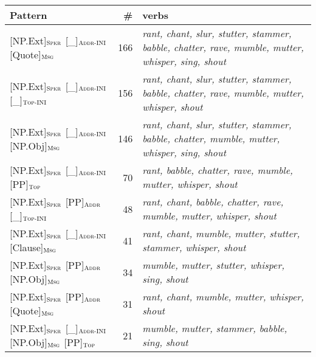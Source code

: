 \documentclass[output=paper,colorlinks,citecolor=brown]{langscibook}
\begin{document}
\begin{table}
\begin{tabularx}{\textwidth}{lrQ}
\lsptoprule
         Pattern  & \#  & verbs \\
\midrule
{[NP.Ext]}$_{\text{\textsc{Spkr}}}$ {[\_]}$_{\text{\textsc{Addr-INI}}}$ {[Quote]}$_{\text{\textsc{Msg}}}$  & 166 & \textit{rant, chant, slur, stutter, stammer, babble, chatter, rave, mumble, mutter, whisper, sing, shout}\\
{[NP.Ext]}$_{\text{\textsc{Spkr}}}$ {[\_]}$_{\text{\textsc{Addr-INI}}}$ {[\_]}$_{\text{\textsc{Top-INI}}}$  & 156 & \textit{rant, chant, slur, stutter, stammer, babble, chatter, rave, mumble, mutter, whisper, shout}\\
{[NP.Ext]}$_{\text{\textsc{Spkr}}}$ {[\_]}$_{\text{\textsc{Addr-INI}}}$ {[NP.Obj]}$_{\text{\textsc{Msg}}}$  & 146 & \textit{rant, chant, slur, stutter, stammer, babble, chatter, mumble, mutter, whisper, sing, shout}\\
{[NP.Ext]}$_{\text{\textsc{Spkr}}}$ {[\_]}$_{\text{\textsc{Addr-INI}}}$ {[PP]}$_{\text{\textsc{Top}}}$  & 70 & \textit{rant, babble, chatter, rave, mumble, mutter, whisper, shout}\\
{[NP.Ext]}$_{\text{\textsc{Spkr}}}$ {[PP]}$_{\text{\textsc{Addr}}}$ {[\_]}$_{\text{\textsc{Top-INI}}}$  & 48 & \textit{rant, chant, babble, chatter, rave, mumble, mutter, whisper, shout}\\
{[NP.Ext]}$_{\text{\textsc{Spkr}}}$ {[\_]}$_{\text{\textsc{Addr-INI}}}$ {[Clause]}$_{\text{\textsc{Msg}}}$  & 41 & \textit{rant, chant, mumble, mutter, stutter, stammer, whisper, shout}\\
{[NP.Ext]}$_{\text{\textsc{Spkr}}}$ {[PP]}$_{\text{\textsc{Addr}}}$ {[NP.Obj]}$_{\text{\textsc{Msg}}}$  & 34 & \textit{mumble, mutter, stutter, whisper, sing, shout}\\
{[NP.Ext]}$_{\text{\textsc{Spkr}}}$ {[PP]}$_{\text{\textsc{Addr}}}$ {[Quote]}$_{\text{\textsc{Msg}}}$  & 31 & \textit{rant, chant, mumble, mutter, whisper, shout}\\
{[NP.Ext]}$_{\text{\textsc{Spkr}}}$ {[\_]}$_{\text{\textsc{Addr-INI}}}$ {[NP.Obj]}$_{\text{\textsc{Msg}}}$ {[PP]}$_{\text{\textsc{Top}}}$  & 21 & \textit{mumble, mutter, stammer, babble, sing, shout}\\

\end{tabularx}
\end{table}
\end{document}
